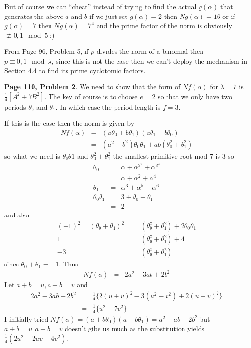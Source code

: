\documentclass[aps,preprint,preprintnumbers,nofootinbib,showpacs,prd]{revtex4-1}
\newcommand{\nbea}{\begin{eqnarray*}}
\newcommand{\neea}{\end{eqnarray*}}
\begin{document}
But of course we can ``cheat'' instead of trying to find the actual $g(\alpha)$ that generates the above $a$ and $b$ if we just set $g(\alpha) = 2$ then $Ng(\alpha) = 16$ or if $g(\alpha) = 7$ then $Ng(\alpha) = 7^4$ and the prime factor of the norm is obviously $\not\equiv 0,1 \mod{5}$ :)

From Page 96, Problem 5, if $p$ divides the norm of a binomial then $p \equiv 0,1 \mod{\lambda}$, since this is not the case then we can't deploy the mechanism in Section 4.4 to find its prime cyclotomic factors.

{\bf Page 110, Problem 2}. We need to show that the form of $Nf(\alpha)$ for $\lambda = 7$ is $\frac{1}{4}[A^2 + 7B^2]$. The key of course is to choose $e=2$ so that we only have two periods $\theta_0$ and $\theta_1$. In which case the period length is $f = 3$.

If this is the case then the norm is given by 
%
\nbea
Nf(\alpha) & = & (a\theta_0 + b\theta_1)(a\theta_1 + b\theta_0) \\
& = & (a^2 + b^2)\theta_0\theta_1  + ab(\theta^2_0 + \theta^2_1)
\neea
%
so what we need is $\theta_0\theta1$ and $\theta^2_0 + \theta^2_1$ the smallest primitive root mod 7 is 3 so
%
\nbea
\theta_0 & = & \alpha + \alpha^{3^2} + \alpha^{3^4} \\
& = & \alpha + \alpha^2 + \alpha^4 \\
\theta_1 & = & \alpha^3 + \alpha^5 + \alpha^6 \\
\theta_0\theta_1 & = & 3 + \theta_0  + \theta_1 \\
& = & 2
\neea
%
and also
%
\nbea
(-1)^2 = (\theta_0 + \theta_1)^2 & = & (\theta^2_0 + \theta^2_1) + 2\theta_0\theta_1 \\
1 & = & (\theta^2_0 + \theta^2_1) + 4 \\
-3 & = & (\theta^2_0 + \theta^2_1)
\neea
%
since $\theta_0 + \theta_1 = -1$. Thus
%
\nbea
Nf(\alpha) & = & 2a^2 -3 ab + 2b^2
\neea
%
Let $a + b = u, a - b = v$ and
%
\nbea
2a^2 -3 ab + 2b^2 & = & \tfrac{1}{4} \{2(u + v)^2 - 3(u^2 - v^2) + 2(u - v)^2 \} \\
& = & \tfrac{1}{4} \{u^2 + 7 v^2 \} 
\neea
%
I initially tried $Nf(\alpha) = (a + b\theta_0)(a + b\theta_1) = a^2 - ab + 2b^2$ but $a + b = u, a - b = v$ doesn't gibe us much as the substitution yields $\frac{1}{4}(2u^2 - 2uv + 4v^2)$.
\end{document}
